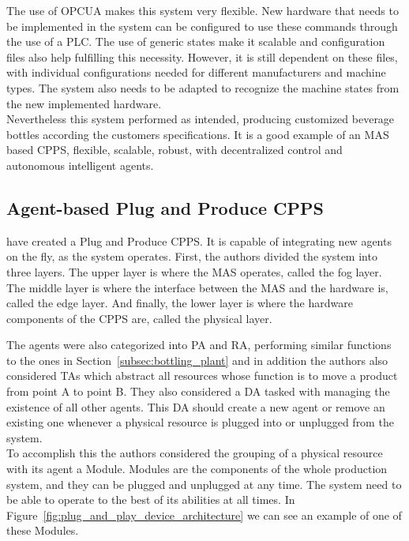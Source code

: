 The use of \gls{OPCUA} makes this system very flexible. New hardware that needs to be implemented in the system can be configured to use these commands through the use of a \gls{PLC}. The use of generic states make it scalable and configuration files also help fulfilling this necessity. However, it is still dependent on these files, with individual configurations needed for different manufacturers and machine types. The system also needs to be adapted to recognize the machine states from the new implemented hardware.\\

Nevertheless this system performed as intended, producing customized beverage bottles according the customers specifications. It is a good example of an \gls{MAS} based \gls{CPPS}, flexible, scalable, robust, with decentralized control and autonomous intelligent agents.
 
\subsection{Agent-based Plug and Produce CPPS}
\label{agent_plug_and_produce}

\citeauthor{8972169} \cite{8972169} have created a Plug and Produce \gls{CPPS}. It is capable of integrating new agents on the fly, as the system operates. First, the authors divided the system into three layers. The upper layer is where the \gls{MAS} operates, called the fog layer. The middle layer is where the interface between the \gls{MAS} and the hardware is, called the edge layer. And finally, the lower layer is where the hardware components of the \gls{CPPS} are, called the physical layer.\\


The agents were also categorized into \gls{PA} and \gls{RA}, performing similar functions to the ones in Section~\ref{subsec:bottling_plant} and in addition the authors also considered \gls{TA}s which abstract all resources whose function is to move a product from point A to point B. They also considered a \gls{DA} tasked with managing the existence of all other agents. This \gls{DA} should create a new agent or remove an existing one whenever a physical resource is plugged into or unplugged from the system.\\

To accomplish this the authors considered the grouping of a physical resource with its agent a Module. Modules are the components of the whole production system, and they can be plugged and unplugged at any time. The system need to be able to operate to the best of its abilities at all times. In Figure~\ref{fig:plug_and_play_device_architecture} we can see an example of one of these Modules.\\

